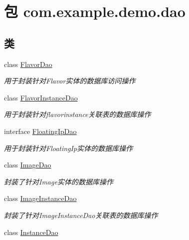 \hypertarget{namespacecom_1_1example_1_1demo_1_1dao}{}\section{包 com.\+example.\+demo.\+dao}
\label{namespacecom_1_1example_1_1demo_1_1dao}
\subsection*{类}
\begin{DoxyCompactItemize}
\item 
class \mbox{\hyperlink{interfacecom_1_1example_1_1demo_1_1dao_1_1_flavor_dao}{Flavor\+Dao}}
\begin{DoxyCompactList}\small\item\em 用于封装针对\+Flavor实体的数据库访问操作 \end{DoxyCompactList}\item 
class \mbox{\hyperlink{interfacecom_1_1example_1_1demo_1_1dao_1_1_flavor_instance_dao}{Flavor\+Instance\+Dao}}
\begin{DoxyCompactList}\small\item\em 用于封装针对flavorinstance关联表的数据库操作 \end{DoxyCompactList}\item 
interface \mbox{\hyperlink{interfacecom_1_1example_1_1demo_1_1dao_1_1_floating_ip_dao}{Floating\+Ip\+Dao}}
\begin{DoxyCompactList}\small\item\em 用于封装针对\+Floating\+Ip实体的数据库操作 \end{DoxyCompactList}\item 
class \mbox{\hyperlink{interfacecom_1_1example_1_1demo_1_1dao_1_1_image_dao}{Image\+Dao}}
\begin{DoxyCompactList}\small\item\em 封装了针对\+Image实体的数据库操作 \end{DoxyCompactList}\item 
class \mbox{\hyperlink{interfacecom_1_1example_1_1demo_1_1dao_1_1_image_instance_dao}{Image\+Instance\+Dao}}
\begin{DoxyCompactList}\small\item\em 封装了针对\+Image\+Instance\+Dao关联表的数据库操作 \end{DoxyCompactList}\item 
class \mbox{\hyperlink{interfacecom_1_1example_1_1demo_1_1dao_1_1_instance_dao}{Instance\+Dao}}

\end{DoxyCompactItemize}
